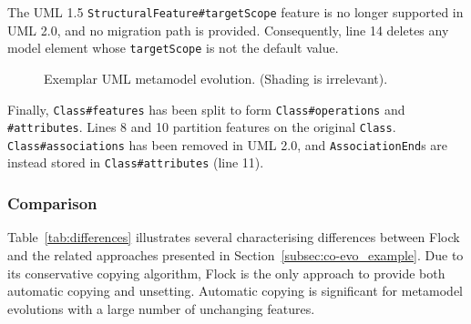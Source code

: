 The UML 1.5 \texttt{St\-ru\-ct\-ur\-alFe\-at\-ur\-e\#t\-ar\-g\-et\-Sc\-op\-e} feature is no longer supported in UML 2.0, and no migration path is provided. Consequently, line 14 deletes any model element whose \texttt{t\-ar\-g\-et\-Sc\-op\-e} is not the default value.

\begin{figure}
	\centering
	\caption[Exemplar UML metamodel evolution]{Exemplar UML metamodel evolution. (Shading is irrelevant).}
\label{fig:uml_mms}
\end{figure}

Finally, \texttt{C\-la\-ss\#fe\-at\-ur\-es} has been split to form \texttt{C\-la\-ss\#op\-er\-at\-io\-ns} and \texttt{\#at\-tr\-ib\-ut\-es}. Lines 8 and 10 partition features on the original \texttt{Cl\-a\-ss}. \texttt{Cl\-as\-s\#a\-ss\-oc\-ia\-ti\-on\-s} has been removed in UML 2.0, and \texttt{As\-so\-ci\-at\-i\-onEn\-d}s are instead stored in \texttt{Cl\-a\-ss\#at\-tr\-ib\-ut\-es} (line 11).


\subsubsection{Comparison}
Table~\ref{tab:differences} illustrates several characterising differences between Flock and the related approaches presented in Section~\ref{subsec:co-evo_example}. Due to its conservative copying algorithm, Flock is the only approach to provide both automatic copying and unsetting. Automatic copying is significant for metamodel evolutions with a large number of unchanging features.

